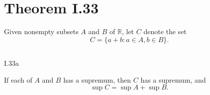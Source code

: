 \documentclass{report}
\begin{document}
\section{Theorem I.33}%
\label{sec:theorem-i.33}

Given nonempty subsets $A$ and $B$ of $\mathbb{R}$, let $C$ denote the set
  $$C = \{a + b : a \in A, b \in B\}.$$


\subsection{}%
\label{sub:theorem-i.33a}

\begin{theorem}{I.33a}

  If each of $A$ and $B$ has a supremum, then $C$ has a supremum, and
    $$\sup{C} = \sup{A} + \sup{B}.$$

\end{theorem}
\end{document}
